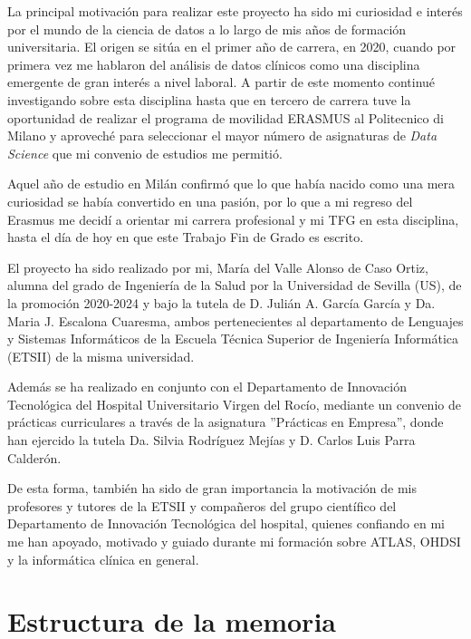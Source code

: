 
La principal motivación para realizar este proyecto ha sido mi curiosidad e interés por el mundo de la ciencia de datos a lo largo de mis años de formación universitaria. El origen se sitúa en el primer año de carrera, en 2020, cuando por primera vez me hablaron del análisis de datos clínicos como una disciplina emergente de gran interés a nivel laboral. A partir de este momento continué investigando sobre esta disciplina hasta que en tercero de carrera tuve la oportunidad de realizar el programa de movilidad ERASMUS al Politecnico di Milano y aproveché para seleccionar el mayor número de asignaturas de \textit{Data Science} que mi convenio de estudios me permitió. 

Aquel año de estudio en Milán confirmó que lo que había nacido como una mera curiosidad se había convertido en una pasión, por lo que a mi regreso del Erasmus me decidí a orientar mi carrera profesional y mi TFG en esta disciplina, hasta el día de hoy en que este Trabajo Fin de Grado es escrito.

El proyecto ha sido realizado por mi, María del Valle Alonso de Caso Ortiz, alumna del grado de Ingeniería de la Salud por la Universidad de Sevilla (US), de la promoción 2020-2024 y bajo la tutela de D. Julián A. García García y Da. Maria J. Escalona Cuaresma, ambos pertenecientes al departamento de Lenguajes y Sistemas Informáticos de la Escuela Técnica Superior de Ingeniería Informática (ETSII) de la misma universidad. 

Además se ha realizado en conjunto con el Departamento de Innovación Tecnológica del Hospital Universitario Virgen del Rocío, mediante un convenio de prácticas curriculares a través de la asignatura ''Prácticas en Empresa'', donde han ejercido la tutela Da. Silvia Rodríguez Mejías y D. Carlos Luis Parra Calderón. 

De esta forma, también ha sido de gran importancia la motivación de mis profesores y tutores de la ETSII y compañeros del grupo científico del Departamento de Innovación Tecnológica del hospital, quienes confiando en mi me han apoyado, motivado y guiado durante mi formación sobre ATLAS, OHDSI y la informática clínica en general.

\section{Estructura de la memoria} \label{sec:01estructura}

